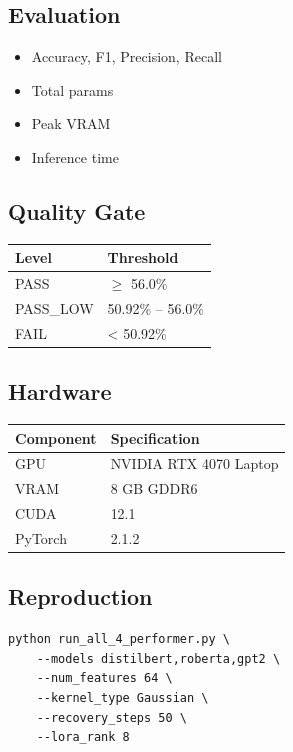 \subsection{Evaluation}

\begin{itemize}
\item Accuracy, F1, Precision, Recall
\item Total params
\item Peak VRAM
\item Inference time

\end{itemize}
\subsection{Quality Gate}

\begin{table}[H]
\centering
\small
\begin{tabular}{ll}
\toprule
\textbf{Level} & \textbf{Threshold} \\
\midrule
PASS & $\ge$ 56.0\% \\
PASS\_LOW & 50.92\% -- 56.0\% \\
FAIL & < 50.92\% \\
\bottomrule
\end{tabular}
\end{table}

\subsection{Hardware}

\begin{table}[H]
\centering
\small
\begin{tabular}{ll}
\toprule
\textbf{Component} & \textbf{Specification} \\
\midrule
GPU & NVIDIA RTX 4070 Laptop \\
VRAM & 8 GB GDDR6 \\
CUDA & 12.1 \\
PyTorch & 2.1.2 \\
\bottomrule
\end{tabular}
\end{table}

\subsection{Reproduction}

\begin{lstlisting}
python run_all_4_performer.py \
    --models distilbert,roberta,gpt2 \
    --num_features 64 \
    --kernel_type Gaussian \
    --recovery_steps 50 \
    --lora_rank 8
\end{lstlisting}

